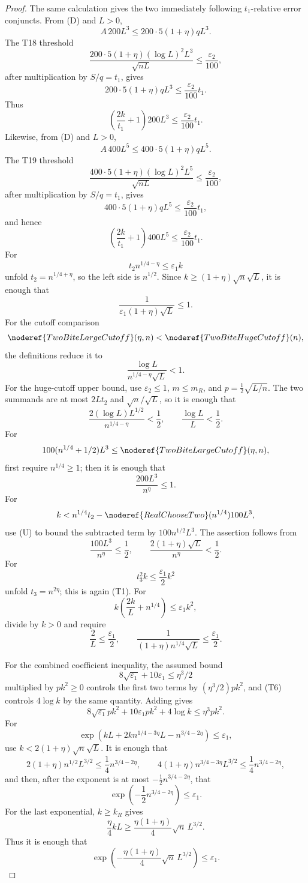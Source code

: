 \begin{proof}
The same calculation gives the two immediately following \(t_1\)-relative
error conjuncts.  From (D) and \(L>0\),
\[
A\,200L^3\le 200\cdot5(1+\eta)qL^3.
\]
The T18 threshold
\[
\frac{200\cdot5(1+\eta)(\log L)^2L^3}{\sqrt{nL}}
\le\frac{\varepsilon_2}{100}, \tag{T18}
\]
after multiplication by \(S/q=t_1\), gives
\[
200\cdot5(1+\eta)qL^3
\le\frac{\varepsilon_2}{100}t_1.
\]
Thus
\[
\left(\frac{2k}{t_1}+1\right)200L^3
\le\frac{\varepsilon_2}{100}t_1.
\]
Likewise, from (D) and \(L>0\),
\[
A\,400L^5\le 400\cdot5(1+\eta)qL^5.
\]
The T19 threshold
\[
\frac{400\cdot5(1+\eta)(\log L)^2L^5}{\sqrt{nL}}
\le\frac{\varepsilon_2}{100}, \tag{T19}
\]
after multiplication by \(S/q=t_1\), gives
\[
400\cdot5(1+\eta)qL^5
\le\frac{\varepsilon_2}{100}t_1,
\]
and hence
\[
\left(\frac{2k}{t_1}+1\right)400L^5
\le\frac{\varepsilon_2}{100}t_1.
\]
For
\[
t_2n^{1/4-\eta}\le\varepsilon_1 k
\]
unfold \(t_2=n^{1/4+\eta}\), so the left side is \(n^{1/2}\).  Since
\(k\ge(1+\eta)\sqrt n\sqrt L\), it is enough that
\[
\frac1{\varepsilon_1(1+\eta)\sqrt L}\le1. \tag{T20}
\]
For the cutoff comparison
\[
\noderef{TwoBiteLargeCutoff}(\eta,n)<\noderef{TwoBiteHugeCutoff}(n),
\]
the definitions reduce it to
\[
\frac{\log L}{n^{1/4-\eta}\sqrt L}<1. \tag{T21}
\]
For the huge-cutoff upper bound, use \(\varepsilon_2\le1\), \(m\le m_R\),
and \(p=\frac12\sqrt{L/n}\).  The two summands are at most
\(2Lt_2\) and \(\sqrt n/\sqrt L\), so it is enough that
\[
\frac{2(\log L)L^{1/2}}{n^{1/4-\eta}}<\frac12,\qquad
\frac{\log L}{L}<\frac12. \tag{T22}
\]
For
\[
100(n^{1/4}+1/2)L^3\le\noderef{TwoBiteLargeCutoff}(\eta,n),
\]
first require \(n^{1/4}\ge1\); then it is enough that
\[
\frac{200L^3}{n^\eta}\le1. \tag{T23}
\]
For
\[
k<n^{1/4}t_2-\noderef{RealChooseTwo}(n^{1/4})100L^3,
\]
use (U) to bound the subtracted term by \(100n^{1/2}L^3\).  The assertion
follows from
\[
\frac{100L^3}{n^\eta}\le\frac12,\qquad
\frac{2(1+\eta)\sqrt L}{n^\eta}<\frac12. \tag{T24}
\]
For
\[
t_3^2k\le\frac{\varepsilon_1}{2}k^2
\]
unfold \(t_3=n^{2\eta}\); this is again (T1). 
For
\[
k\left(\frac{2k}{L}+n^{1/4}\right)\le\varepsilon_1 k^2,
\]
divide by \(k>0\) and require
\[
\frac2L\le\frac{\varepsilon_1}{2},\qquad
\frac1{(1+\eta)n^{1/4}\sqrt L}\le\frac{\varepsilon_1}{2}. \tag{T26}
\]

For the combined coefficient inequality, the assumed bound
\[
8\sqrt{\varepsilon_1}+10\varepsilon_1\le\eta^3/2
\]
multiplied by \(pk^2\ge0\) controls the first two terms by
\((\eta^3/2)pk^2\), and (T6) controls \(4\log k\) by the same quantity.
Adding gives
\[
8\sqrt{\varepsilon_1}pk^2+10\varepsilon_1pk^2+4\log k
\le\eta^3pk^2. \tag{T27}
\]
For
\[
\exp(kL+2kn^{1/4-3\eta}L-n^{3/4-2\eta})\le\varepsilon_1,
\]
use \(k<2(1+\eta)\sqrt n\sqrt L\).  It is enough that
\[
2(1+\eta)n^{1/2}L^{3/2}\le\frac14n^{3/4-2\eta},
\qquad
4(1+\eta)n^{3/4-3\eta}L^{3/2}\le\frac14n^{3/4-2\eta},
\]
and then, after the exponent is at most \(-\frac12n^{3/4-2\eta}\), that
\[
\exp\left(-\frac12n^{3/4-2\eta}\right)\le\varepsilon_1. \tag{T28}
\]
For the last exponential, \(k\ge k_R\) gives
\[
\frac{\eta}{4}kL\ge\frac{\eta(1+\eta)}4\sqrt n\,L^{3/2}.
\]
Thus it is enough that
\[
\exp\left(-\frac{\eta(1+\eta)}4\sqrt n\,L^{3/2}\right)
\le\varepsilon_1. \tag{T29}
\]


\end{proof}
